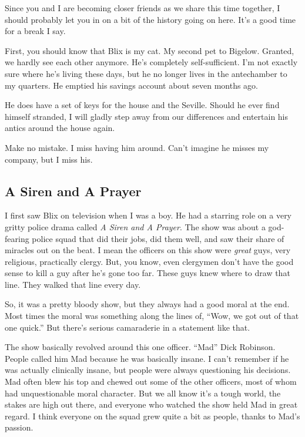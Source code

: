 \documentclass[12pt,twoside]{report}
\begin{document}
Since you and I are becoming closer friends as we share this time
together, I should probably let you in on a bit of the history going
on here.  It's a good time for a break I say.

First, you should know that Blix is my cat.  My second pet to
Bigelow. Granted, we hardly see each other anymore.  He's completely
self-sufficient. I'm not exactly sure where he's living these days,
but he no longer lives in the antechamber to my quarters.  He emptied
his savings account about seven months ago.

He does have a set of keys for the house and the Seville.  Should he
ever find himself stranded, I will gladly step away from our
differences and entertain his antics around the house again.

Make no mistake.  I miss having him around.  Can't imagine he misses
my company, but I miss his.



\subsection{A Siren and A Prayer}



I first saw Blix on television when I was a boy.  He had a starring
role on a very gritty police drama called {\em A Siren and A Prayer}.
The show was about a god-fearing police squad that did their jobs, did
them well, and saw their share of miracles out on the beat.  I mean
the officers on this show were {\em great} guys, very religious,
practically clergy.  But, you know, even clergymen don't have the good
sense to kill a guy after he's gone too far. These guys knew where to
draw that line.  They walked that line every day.

So, it was a pretty bloody show, but they always had a good moral at
the end.  Most times the moral was something along the lines of,
``Wow, we got out of that one quick.''  But there's serious
camaraderie in a statement like that.

The show basically revolved around this one officer.  ``Mad'' Dick
Robinson.  People called him Mad because he was basically insane.  I
can't remember if he was actually clinically insane, but people were
always questioning his decisions.  Mad often blew his top and chewed
out some of the other officers, most of whom had unquestionable moral
character.  But we all know it's a tough world, the stakes are high
out there, and everyone who watched the show held Mad in great regard.
I think everyone on the squad grew quite a bit as people, thanks to
Mad's passion.
\end{document}
